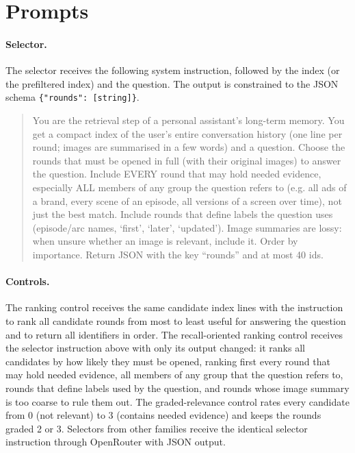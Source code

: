 \section{Prompts}
\label{app:prompts}

\paragraph{Selector.} The \qss{} selector receives the following system instruction, followed by the index (or the prefiltered index) and the question. The output is constrained to the JSON schema \texttt{\{"rounds": [string]\}}.

\begin{quote}\small
You are the retrieval step of a personal assistant's long-term memory. You get a compact index of the user's entire conversation history (one line per round; images are summarised in a few words) and a question. Choose the rounds that must be opened in full (with their original images) to answer the question. Include EVERY round that may hold needed evidence, especially ALL members of any group the question refers to (e.g. all ads of a brand, every scene of an episode, all versions of a screen over time), not just the best match. Include rounds that define labels the question uses (episode/arc names, `first', `later', `updated'). Image summaries are lossy: when unsure whether an image is relevant, include it. Order by importance. Return JSON with the key ``rounds'' and at most 40 ids.
\end{quote}

\paragraph{Controls.} The ranking control receives the same candidate index lines with the instruction to rank all candidate rounds from most to least useful for answering the question and to return all identifiers in order. The recall-oriented ranking control receives the selector instruction above with only its output changed: it ranks all candidates by how likely they must be opened, ranking first every round that may hold needed evidence, all members of any group that the question refers to, rounds that define labels used by the question, and rounds whose image summary is too coarse to rule them out. The graded-relevance control rates every candidate from 0 (not relevant) to 3 (contains needed evidence) and keeps the rounds graded 2 or 3. Selectors from other families receive the identical selector instruction through OpenRouter with JSON output.

